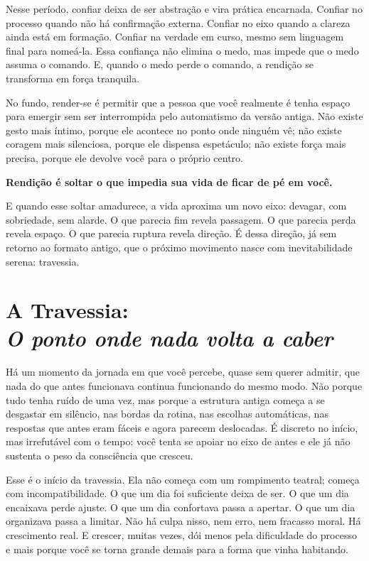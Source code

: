 \documentclass[12pt]{book}
\begin{document}
Nesse período, confiar deixa de ser abstração e vira prática encarnada. Confiar no processo quando não há confirmação externa. Confiar no eixo quando a clareza ainda está em formação. Confiar na verdade em curso, mesmo sem linguagem final para nomeá-la. Essa confiança não elimina o medo, mas impede que o medo assuma o comando. E, quando o medo perde o comando, a rendição se transforma em força tranquila.

No fundo, render-se é permitir que a pessoa que você realmente é tenha espaço para emergir sem ser interrompida pelo automatismo da versão antiga. Não existe gesto mais íntimo, porque ele acontece no ponto onde ninguém vê; não existe coragem mais silenciosa, porque ele dispensa espetáculo; não existe força mais precisa, porque ele devolve você para o próprio centro.

\textbf{Rendição é soltar o que impedia sua vida de ficar de pé em você.}

E quando esse soltar amadurece, a vida aproxima um novo eixo: devagar, com sobriedade, sem alarde. O que parecia fim revela passagem. O que parecia perda revela espaço. O que parecia ruptura revela direção. É dessa direção, já sem retorno ao formato antigo, que o próximo movimento nasce com inevitabilidade serena: travessia.


\chapter[A Travessia: O ponto onde nada volta a caber]{A Travessia:\\[0.4ex]\large\itshape O ponto onde nada volta a caber}

Há um momento da jornada em que você percebe, quase sem querer admitir, que nada do que antes funcionava continua funcionando do mesmo modo. Não porque tudo tenha ruído de uma vez, mas porque a estrutura antiga começa a se desgastar em silêncio, nas bordas da rotina, nas escolhas automáticas, nas respostas que antes eram fáceis e agora parecem deslocadas. É discreto no início, mas irrefutável com o tempo: você tenta se apoiar no eixo de antes e ele já não sustenta o peso da consciência que cresceu.

Esse é o início da travessia. Ela não começa com um rompimento teatral; começa com incompatibilidade. O que um dia foi suficiente deixa de ser. O que um dia encaixava perde ajuste. O que um dia confortava passa a apertar. O que um dia organizava passa a limitar. Não há culpa nisso, nem erro, nem fracasso moral. Há crescimento real. E crescer, muitas vezes, dói menos pela dificuldade do processo e mais porque você se torna grande demais para a forma que vinha habitando.
\end{document}

